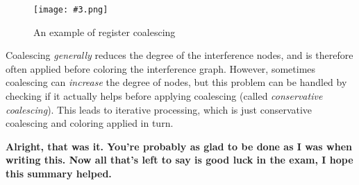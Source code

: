 \documentclass{article}
\newcommand{\fig}[4]{
	\begin{figure}[#1]
		\center
		\texttt{[image: \#3.png]}
		\caption{#4}
		\label{fig:#3}
	\end{figure}
	}
\begin{document}
\fig{h}{0.7}{coalescing}{An example of register coalescing}

Coalescing \emph{generally} reduces the degree of the interference nodes, and is therefore often applied before coloring the interference graph.
However, sometimes coalescing can \emph{increase} the degree of nodes, but this problem can be handled by checking if it actually helps before applying coalescing (called \emph{conservative coalescing}).
This leads to iterative processing, which is just conservative coalescing and coloring applied in turn.

\textbf{Alright, that was it. You're probably as glad to be done as I was when writing this.
Now all that's left to say is good luck in the exam, I hope this summary helped.}
\end{document}
